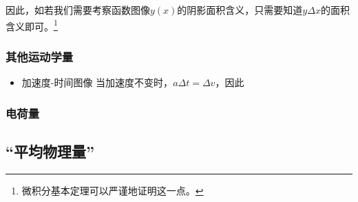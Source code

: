 因此，如若我们需要考察函数图像$y(x)$的阴影面积含义，只需要知道$y\Delta x$的面积含义即可。\footnote{微积分基本定理可以严谨地证明这一点。}
\subsubsection{其他运动学量}
\begin{itemize}
\item 加速度-时间图像 当加速度不变时，$a\Delta t=\Delta v$，因此
\end{itemize}

\subsubsection{电荷量}
\subsection{“平均物理量”}